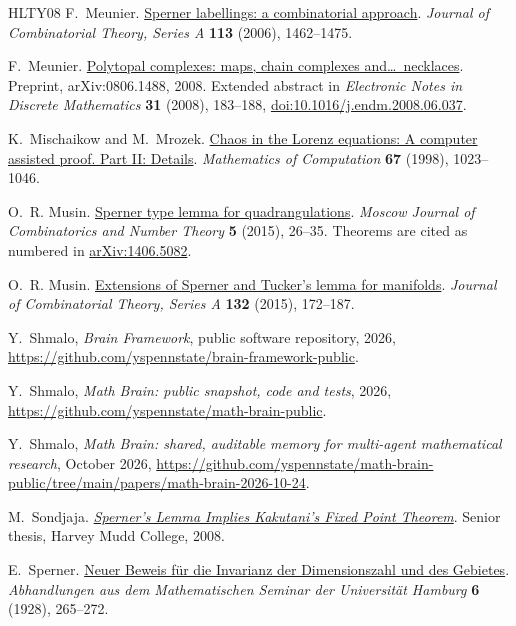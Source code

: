 \documentclass[11pt]{amsart}
\theoremstyle{definition}
\theoremstyle{remark}
\numberwithin{equation}{section}
\begin{document}
\begin{thebibliography}{HLTY08}
F.~Meunier.
\href{https://doi.org/10.1016/j.jcta.2006.01.006}{Sperner labellings: a combinatorial approach}.
\emph{Journal of Combinatorial Theory, Series A} \textbf{113} (2006), 1462--1475.

F.~Meunier.
\href{https://arxiv.org/abs/0806.1488}{Polytopal complexes: maps, chain complexes and\ldots\ necklaces}.
Preprint, arXiv:0806.1488, 2008. Extended abstract in \emph{Electronic Notes in Discrete Mathematics} \textbf{31} (2008), 183--188, \href{https://doi.org/10.1016/j.endm.2008.06.037}{doi:10.1016/j.endm.2008.06.037}.

K.~Mischaikow and M.~Mrozek.
\href{https://doi.org/10.1090/S0025-5718-98-00945-4}{Chaos in the Lorenz equations: A computer assisted proof. Part II: Details}.
\emph{Mathematics of Computation} \textbf{67} (1998), 1023--1046.

O.~R. Musin.
\href{https://arxiv.org/abs/1406.5082}{Sperner type lemma for quadrangulations}.
\emph{Moscow Journal of Combinatorics and Number Theory} \textbf{5} (2015), 26--35. Theorems are cited as numbered in \href{https://arxiv.org/abs/1406.5082}{arXiv:1406.5082}.

O.~R. Musin.
\href{https://doi.org/10.1016/j.jcta.2014.12.001}{Extensions of Sperner and Tucker's lemma for manifolds}.
\emph{Journal of Combinatorial Theory, Series A} \textbf{132} (2015), 172--187.

Y.~Shmalo, \emph{Brain Framework}, public software repository, 2026, \url{https://github.com/yspennstate/brain-framework-public}.

Y.~Shmalo, \emph{Math Brain: public snapshot, code and tests}, 2026, \url{https://github.com/yspennstate/math-brain-public}.

Y.~Shmalo, \emph{Math Brain: shared, auditable memory for multi-agent mathematical research}, October 2026, \url{https://github.com/yspennstate/math-brain-public/tree/main/papers/math-brain-2026-10-24}.

M.~Sondjaja.
\href{https://scholarship.claremont.edu/hmc_theses/214/}{\emph{Sperner's Lemma Implies Kakutani's Fixed Point Theorem}}.
Senior thesis, Harvey Mudd College, 2008.

E.~Sperner.
\href{https://doi.org/10.1007/BF02940617}{Neuer Beweis f\"ur die Invarianz der Dimensionszahl und des Gebietes}.
\emph{Abhandlungen aus dem Mathematischen Seminar der Universit\"at Hamburg} \textbf{6} (1928), 265--272.


\end{thebibliography}
\end{document}

